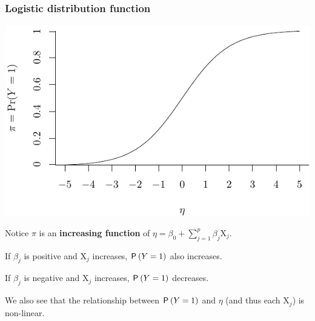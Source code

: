 \documentclass{beamer}
\begin{document}
\begin{frame}[fragile]
\frametitle{Logistic distribution function}



\begin{center}
\includegraphics[width = 0.7\linewidth]{img/c4/08-glm-logisticcdf}
\end{center}
\bi
\item Notice $\pi$ is an \textbf{increasing function} of $\eta=\beta_0 + \sum_{j=1}^p \beta_j \mathrm{X}_{j}$.
{\small \bi 
\item If $\beta_j$ is positive and $\mathrm{X}_{j}$ increases, $\P{Y=1}$ also increases.  
\item If $\beta_j$ is negative and $\mathrm{X}_{j}$ increases, $\P{Y=1}$ decreases. 
\ei
}
\item We also see that the relationship between $\P{Y=1}$ and $\eta$ (and thus each $\mathrm{X}_{j}$) is \alert{non-linear}.
\ei
\end{frame}
% 
% 
% 
% 
% 
\end{document}
